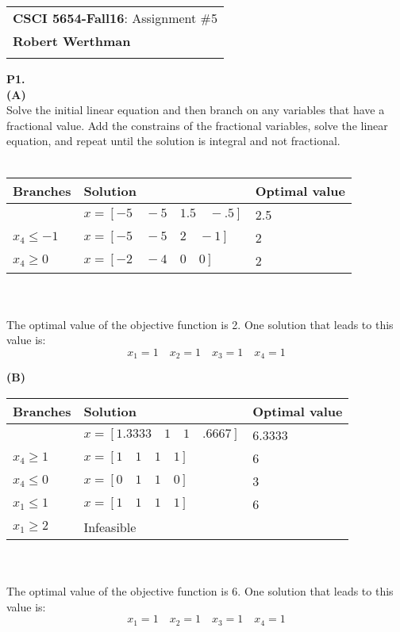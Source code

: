 \documentclass[11pt]{article}
\begin{document}

\begin{tabular}{l}
	\textbf{CSCI 5654-Fall16}: Assignment \#5 \\
	\textbf{Robert Werthman} \phantom{Supercalifragilisticexpialidocius Smith} \\
	\hline \\[10pt]
\end{tabular}

\noindent\textbf{P1.}
\\
\noindent\textbf{(A)}
\\
Solve the initial linear equation and then branch on any variables that have a fractional value.  Add the constrains of the fractional variables, solve the linear equation, and repeat until the solution is integral and not fractional.\\ \\
\begin{tabular}{|l|l|l|}
\hline
Branches & Solution & Optimal value \\ \hline
& $x = [-5\quad-5\quad1.5\quad-.5]$ & 2.5 \\ \hline
$x_4 \leq -1$ & $x = [-5\quad-5\quad2\quad-1]$ & 2\\ \hline
$x_4 \geq 0$ & $x = [-2\quad-4\quad0\quad0]$ & 2 \\ \hline
\end{tabular}
\\ \\
The optimal value of the objective function is 2.  One solution that leads to this value is: 
$$
x_1 = 1 \quad x_2 = 1 \quad x_3 = 1 \quad x_4 = 1
$$


\noindent\textbf{(B)}
\\
\begin{tabular}{|l|l|l|}
\hline
Branches & Solution & Optimal value \\ \hline
& $x = [1.3333\quad1\quad1\quad.6667]$ & 6.3333 \\ \hline
$x_4 \geq 1$ & $x = [1\quad1\quad1\quad1]$ & 6 \\ \hline
$x_4 \leq 0$ & $x = [0\quad1\quad1\quad0]$ & 3 \\ \hline
$x_1 \leq 1$ & $x = [1\quad1\quad1\quad1]$ & 6 \\ \hline
$x_1 \geq 2$ & Infeasible & \\ \hline
\end{tabular}
\\ \\
The optimal value of the objective function is 6.  One solution that leads to this value is:
$$
x_1 = 1 \quad x_2 = 1 \quad x_3 = 1 \quad x_4 = 1
$$
\end{document}
